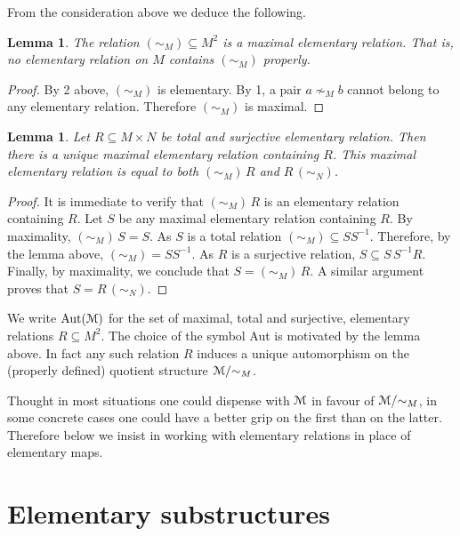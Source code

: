 \documentclass[12pt,letterpaper,oneside,reqno]{amsart}
\theoremstyle{plain}
\newtheorem{lemma}[theorem]{Lemma}
\theoremstyle{remark}
\begin{document}
From the consideration above we deduce the following.
\begin{lemma}
  The relation $(\sim_{M\!})\subseteq M^2$ is a maximal elementary relation.
  That is, no elementary relation on $M$ contains $(\sim_{M\!})$ properly.
\end{lemma}

\begin{proof}
  By 2 above, $(\sim_{M\!})$ is elementary.
  By 1, a pair $a\nsim_M\!b$ cannot belong to any elementary relation.
  Therefore  $(\sim_{M\!})$ is maximal.
\end{proof}

\begin{lemma}
  Let $R\subseteq M\times N$ be total and surjective elementary relation.
  Then there is a unique maximal elementary relation containing $R$.
  This maximal elementary relation is equal to both $(\sim_{M\!})\,R$ and $R\,(\sim_{N\!})$.
\end{lemma}
\begin{proof}
  It is immediate to verify that $(\sim_{M\!})\,R$ is an elementary relation containing $R$.
  Let $S$ be any maximal elementary relation containing $R$.
  By maximality, $(\sim_{M\!})\,S=S$.
  As $S$ is a total relation $(\sim_{M\!})\subseteq SS^{-1}$.
  Therefore, by the lemma above, $(\sim_{M\!})=SS^{-1}$.
  As $R$ is a surjective relation, $S\subseteq S\,S^{-1}R$.
  Finally, by maximality, we conclude that $S=(\sim_{M\!})\,R$.
  A similar argument proves that $S=R\,(\sim_{N\!})$.
\end{proof}

We write ${\rm Aut}({\EuScript M})$ for the set of maximal, total and surjective, elementary relations $R\subseteq M^2$.
The choice of the symbol Aut is motivated by the lemma above.
In fact any such relation $R$ induces a unique automorphism on the (properly defined) quotient structure ${\EuScript M}/{\sim_M}$.

Thought in most situations one could dispense with ${\EuScript M}$ in favour of ${\EuScript M}/{\sim_M}$, in some concrete cases one could have a better grip on the first than on the latter.
Therefore below we insist in working with elementary relations in place of elementary maps.


\section{Elementary substructures}
\end{document}
